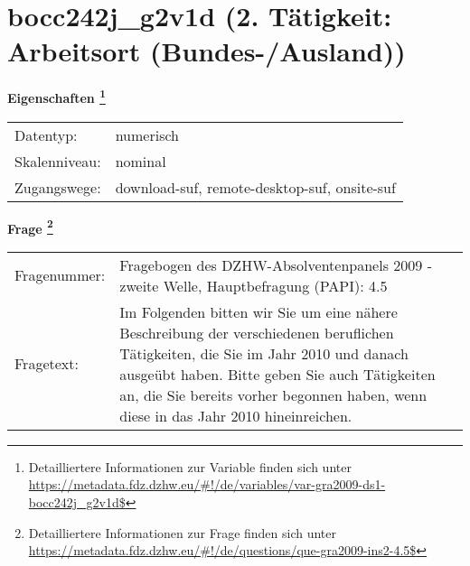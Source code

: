 
    \setcounter{footnote}{0}

    \vspace*{-1.8cm}
	\section{bocc242j\_g2v1d (2. Tätigkeit: Arbeitsort (Bundes-/Ausland))}
	\label{section:bocc242j_g2v1d}



    \vspace*{0.5cm}
    \noindent\textbf{Eigenschaften
	\footnote{Detailliertere Informationen zur Variable finden sich unter
		\url{https://metadata.fdz.dzhw.eu/\#!/de/variables/var-gra2009-ds1-bocc242j_g2v1d$}}}\\
	\begin{tabularx}{\hsize}{@{}lX}
	Datentyp: & numerisch \\
	Skalenniveau: & nominal \\
	Zugangswege: &
	  download-suf, 
	  remote-desktop-suf, 
	  onsite-suf
 \\
    \end{tabularx}



				\vspace*{0.5cm}
                \noindent\textbf{Frage
	                \footnote{Detailliertere Informationen zur Frage finden sich unter
		              \url{https://metadata.fdz.dzhw.eu/\#!/de/questions/que-gra2009-ins2-4.5$}}}\\
				\begin{tabularx}{\hsize}{@{}lX}
					Fragenummer: &
					  Fragebogen des DZHW-Absolventenpanels 2009 - zweite Welle, Hauptbefragung (PAPI):
					  4.5
 \\
					Fragetext: & Im Folgenden bitten wir Sie um eine nähere Beschreibung der verschiedenen beruflichen Tätigkeiten, die Sie im Jahr 2010 und danach ausgeübt haben. Bitte geben Sie auch Tätigkeiten an, die Sie bereits vorher begonnen haben, wenn diese in das Jahr 2010 hineinreichen. \\
				\end{tabularx}





